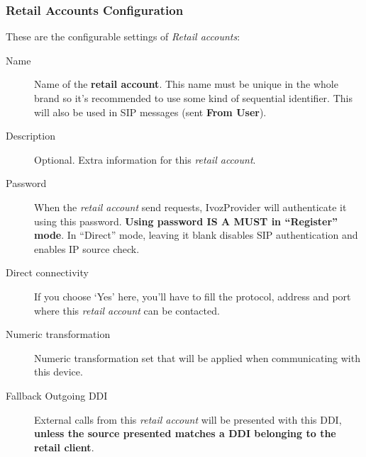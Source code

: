 \documentclass[letterpaper,10pt,english]{sphinxmanual}
\begin{document}
\subsubsection{Retail Accounts Configuration}
\label{administration_portal/client/retail/retail_accounts:retail-accounts-configuration}
These are the configurable settings of \emph{Retail accounts}:
\begin{description}
\item[{Name}] \leavevmode{}\label{administration_portal/client/retail/retail_accounts:term-name}
Name of the \textbf{retail account}. This name must be unique in the whole brand so
it's recommended to use some kind of sequential identifier. This will also be used
in SIP messages (sent \textbf{From User}).

\item[{Description}] \leavevmode{}\label{administration_portal/client/retail/retail_accounts:term-description}
Optional. Extra information for this \emph{retail account}.

\item[{Password}] \leavevmode{}\label{administration_portal/client/retail/retail_accounts:term-password}
When the \emph{retail account} send requests, IvozProvider will authenticate it using
this password. \textbf{Using password IS A MUST in ``Register'' mode}. In ``Direct'' mode,
leaving it blank disables SIP authentication and enables IP source check.

\item[{Direct connectivity}] \leavevmode{}\label{administration_portal/client/retail/retail_accounts:term-direct-connectivity}
If you choose `Yes' here, you'll have to fill the protocol, address and
port where this \emph{retail account} can be contacted.

\item[{Numeric transformation}] \leavevmode{}\label{administration_portal/client/retail/retail_accounts:term-numeric-transformation}
Numeric transformation set that will be applied when communicating with this device.

\item[{Fallback Outgoing DDI}] \leavevmode{}\label{administration_portal/client/retail/retail_accounts:term-fallback-outgoing-ddi}
External calls from this \emph{retail account} will be presented with this DDI, \textbf{unless
the source presented matches a DDI belonging to the retail client}.


\end{description}
\end{document}
